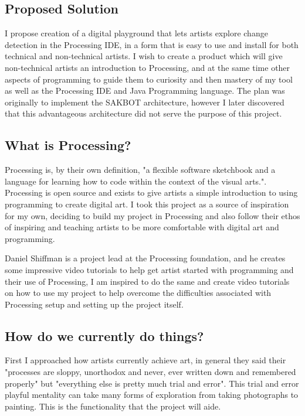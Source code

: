 \documentclass[a4paper]{report}
\begin{document}
\subsection{Proposed Solution}
I propose creation of a digital playground that lets artists explore change detection in the Processing\cite{PROCESSING} IDE, in a form that is easy to use and install for both technical and non-technical artists. I wish to create a product which will give non-technical artists an introduction to Processing, and at the same time other aspects of programming to guide them to curiosity and then mastery of my tool as well as the Processing IDE and Java Programming language. The plan was originally to implement the SAKBOT architecture\cite{SAKBOT}, however I later discovered that this advantageous architecture did not serve the purpose of this project.

\subsection{What is Processing?}
Processing is, by their own definition, "a flexible software sketchbook and a language for learning how to code within the context of the visual arts."\cite{PROCESSING}. Processing is open source and exists to give artists a simple introduction to using programming to create digital art. I took this project as a source of inspiration for my own, deciding to build my project in Processing and also follow their ethos of inspiring and teaching artists to be more comfortable with digital art and programming.

Daniel Shiffman \cite{SHIFFMAN} is a project lead at the Processing foundation, and he creates some impressive video tutorials to help get artist started with programming and their use of Processing, I am inspired to do the same and create video tutorials on how to use my project to help overcome the difficulties associated with Processing setup and setting up the project itself.

\subsection{How do we currently do things?}
First I approached how artists currently achieve art, in general they said their "processes are sloppy, unorthodox and never, ever written down and remembered properly" but "everything else is pretty much trial and error". This trial and error playful mentality can take many forms of exploration from taking photographs to painting. This is the functionality that the project will aide.
\end{document}
